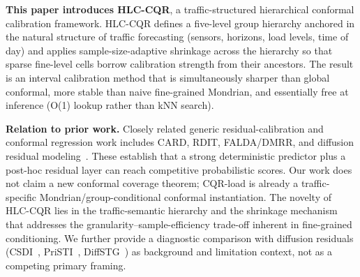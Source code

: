 \documentclass[letterpaper,journal]{IEEEtran}
\begin{document}
\textbf{This paper introduces HLC-CQR}, a traffic-structured hierarchical
conformal calibration framework.  HLC-CQR defines a five-level group
hierarchy anchored in the natural structure of traffic forecasting (sensors,
horizons, load levels, time of day) and applies sample-size-adaptive
shrinkage across the hierarchy so that sparse fine-level cells borrow
calibration strength from their ancestors.  The result is an interval
calibration method that is simultaneously sharper than global conformal,
more stable than naive fine-grained Mondrian, and essentially free at
inference (O(1) lookup rather than kNN search).

\textbf{Relation to prior work.}
Closely related generic residual-calibration and conformal regression work
includes CARD, RDIT, FALDA/DMRR, and diffusion residual
modeling~\cite{han2022card,lai2025rdit,wang2025falda,qi2026diffusionresidual}.
These establish that a strong deterministic predictor plus a post-hoc residual
layer can reach competitive probabilistic scores.  Our work does not claim a
new conformal coverage theorem; CQR-load is already a traffic-specific
Mondrian/group-conditional conformal instantiation.  The novelty of HLC-CQR
lies in the traffic-semantic hierarchy and the shrinkage mechanism that
addresses the granularity--sample-efficiency trade-off inherent in fine-grained
conditioning.  We further provide a diagnostic comparison with diffusion
residuals (CSDI~\cite{tashiro2021csdi}, PriSTI~\cite{liu2023pristi},
DiffSTG~\cite{wen2023diffstg}) as background and limitation context, not
as a competing primary framing.
\end{document}
